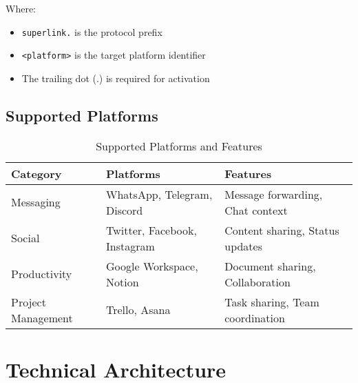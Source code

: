 \documentclass[12pt]{article}
\begin{document}
Where:
\begin{itemize}
    \item \texttt{superlink.} is the protocol prefix
    \item \texttt{<platform>} is the target platform identifier
    \item The trailing dot (.) is required for activation
\end{itemize}

\subsection{Supported Platforms}
\begin{table}[H]
\centering
\begin{tabular}{lll}
\toprule
\textbf{Category} & \textbf{Platforms} & \textbf{Features} \\
\midrule
Messaging & WhatsApp, Telegram, Discord & Message forwarding, Chat context \\
Social & Twitter, Facebook, Instagram & Content sharing, Status updates \\
Productivity & Google Workspace, Notion & Document sharing, Collaboration \\
Project Management & Trello, Asana & Task sharing, Team coordination \\
\bottomrule
\end{tabular}
\caption{Supported Platforms and Features}
\end{table}

\section{Technical Architecture}
\end{document}
